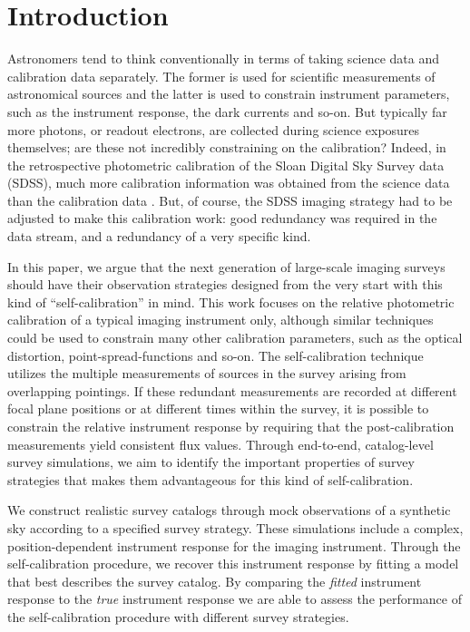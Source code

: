 \documentclass[preprint,pdftex]{aastex}
\begin{document}
\section{Introduction}
Astronomers tend to think conventionally in terms of taking science data and calibration data separately. The former is used for scientific measurements of astronomical sources and the latter is used to constrain instrument parameters, such as the instrument response, the dark currents and so-on. But typically far more photons, or readout electrons, are collected during science exposures themselves; are these not incredibly constraining on the calibration? Indeed, in the retrospective photometric calibration of the Sloan Digital Sky Survey data (SDSS), much more calibration information was obtained from the science data than the calibration data \citep{pad08}. But, of course, the SDSS imaging strategy had to be adjusted to make this calibration work: good redundancy was required in the data stream, and a redundancy of a very specific kind.

In this paper, we argue that the next generation of large-scale imaging surveys should have their observation strategies designed from the very start with this kind of ``self-calibration'' in mind. This work focuses on the relative photometric calibration of a typical imaging instrument only, although similar techniques could be used to constrain many other calibration parameters, such as the optical distortion, point-spread-functions and so-on. The self-calibration technique utilizes the multiple measurements of sources in the survey arising from overlapping pointings. If these redundant measurements are recorded at different focal plane positions or at different times within the survey, it is possible to constrain the relative instrument response by requiring that the post-calibration measurements yield consistent flux values. Through end-to-end, catalog-level survey simulations, we aim to identify the important properties of survey strategies that makes them advantageous for this kind of self-calibration. 

We construct realistic survey catalogs through mock observations of a synthetic sky according to a specified survey strategy. These simulations include a complex, position-dependent instrument response for the imaging instrument. Through the self-calibration procedure, we recover this instrument response by fitting a model that best describes the survey catalog. By comparing the \textit{fitted} instrument response to the \textit{true} instrument response we are able to assess the performance of the self-calibration procedure with different survey strategies. 
\end{document}
